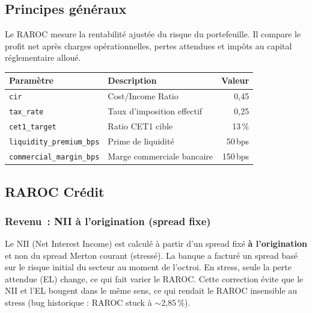 \documentclass[12pt,a4paper]{article}
\begin{document}
\subsection{Principes g\'en\'eraux}

Le RAROC mesure la rentabilit\'e ajust\'ee du risque du portefeuille. Il compare le profit net apr\`es charges op\'erationnelles, pertes attendues et imp\^ots au capital r\'eglementaire allou\'e.

\begin{definitionbox}
\begin{tabular}{llr}
\toprule
\textbf{Param\`etre} & \textbf{Description} & \textbf{Valeur} \\
\midrule
\texttt{cir} & Cost/Income Ratio & 0{,}45 \\
\texttt{tax\_rate} & Taux d'imposition effectif & 0{,}25 \\
\texttt{cet1\_target} & Ratio CET1 cible & 13\,\% \\
\texttt{liquidity\_premium\_bps} & Prime de liquidit\'e & 50\,bps \\
\texttt{commercial\_margin\_bps} & Marge commerciale bancaire & 150\,bps \\
\bottomrule
\end{tabular}
\end{definitionbox}

\subsection{RAROC Cr\'edit}

\subsubsection{Revenu~: NII \`a l'origination (spread fixe)}

\begin{warningbox}
Le NII (Net Interest Income) est calcul\'e \`a partir d'un spread fix\'e \textbf{\`a l'origination} et non du spread Merton courant (stress\'e). La banque a factur\'e un spread bas\'e sur le risque initial du secteur au moment de l'octroi. En stress, seule la perte attendue (EL) change, ce qui fait varier le RAROC. Cette correction \'evite que le NII et l'EL bougent dans le m\^eme sens, ce qui rendait le RAROC insensible au stress (bug historique : RAROC stuck \`a $\sim$2{,}85\,\%).
\end{warningbox}
\end{document}
